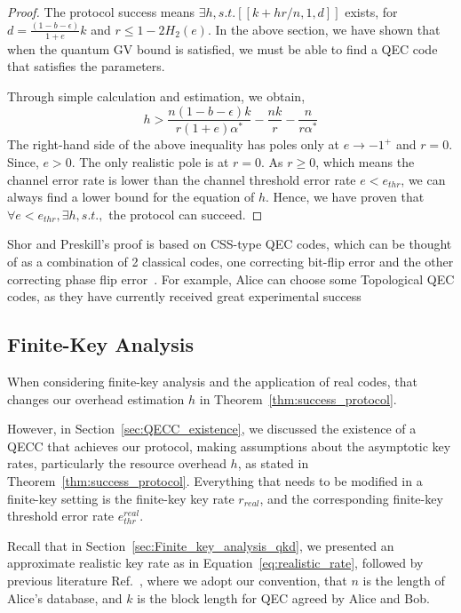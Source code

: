 \documentclass[%
 reprint,
superscriptaddress,
 amsmath,amssymb,
 aps,
]{revtex4-2}
\begin{document}
\begin{proof}
    The protocol success means $\exists h, s.t. [[k+hr/n, 1, d]]$ exists, for $d=\frac{(1-b-\epsilon)}{1+e}k$ and $r\le1-2H_2(e)$. In the above section, we have shown that when the quantum GV bound is satisfied, we must be able to find a QEC code that satisfies the parameters.

    Through simple calculation and estimation, we obtain,
    \begin{equation}
         h>\frac{n(1-b-\epsilon)k}{r(1+e)\alpha^*}-\frac{nk}{r}-\frac{n}{r\alpha^*}
    \end{equation}
    The right-hand side of the above inequality has poles only at $e\rightarrow-1^+$ and $r=0$. Since, $e>0$. The only realistic pole is at $r=0$. As $r\ge0$, which means the channel error rate is lower than the channel threshold error rate $e<e_{thr}$, we can always find a lower bound for the equation of $h$. Hence, we have proven that $\forall e<e_{thr}, \exists h, s.t.,$ the protocol can succeed.
\end{proof}

Shor and Preskill's proof is based on CSS-type QEC codes, which can be thought of as a combination of 2 classical codes, one correcting bit-flip error and the other correcting phase flip error~\cite{CSS_Shor_Calderbank, CSS_Steane, Shors_9_qubits_code}. For example, Alice can choose some Topological QEC codes, as they have currently received great experimental success~\cite{Surfacecode1, google_surface_code, TQEC1}

\subsection{Finite-Key Analysis}
When considering finite-key analysis and the application of real codes, that changes our overhead estimation $h$ in Theorem~\ref{thm:success_protocol}.

However, in Section~\ref{sec:QECC_existence}, we discussed the existence of a QECC that achieves our protocol, making assumptions about the asymptotic key rates, particularly the resource overhead $h$, as stated in Theorem~\ref{thm:success_protocol}. Everything that needs to be modified in a finite-key setting is the finite-key key rate $r_{real}$, and the corresponding finite-key threshold error rate $e_{thr}^{real}$.

Recall that in Section~\ref{sec:Finite_key_analysis_qkd}, we presented an approximate realistic key rate as in Equation~\ref{eq:realistic_rate}, followed by previous literature Ref.~\cite{Rates_for_realistic_code1, Rates_for_realistic_code2, Rates_for_realistic_code3, Finite_key_analysis1, Finite_key_analysis2, Finite_key_analysis3}, where we adopt our convention, that $n$ is the length of Alice's database, and $k$ is the block length for QEC agreed by Alice and Bob.
\end{document}
